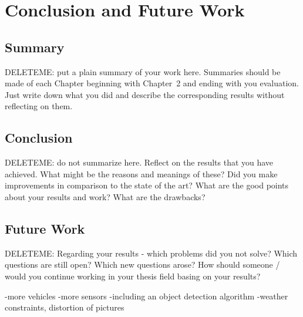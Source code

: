 \chapter{Conclusion and Future Work}
\label{conclusion}
\section{Summary}
DELETEME: put a plain summary of your work here. Summaries should be made of each Chapter beginning with Chapter~2 and ending with you evaluation. Just write down what you did and describe the corresponding results without reflecting on them.

\section{Conclusion}
DELETEME: do not summarize here. Reflect on the results that you have achieved. What might be the reasons and meanings of these? Did you make improvements in comparison to the state of the art? What are the good points about your results and work? What are the drawbacks? 

\section{Future Work}
DELETEME: Regarding your results - which problems did you not solve? Which questions are still open? Which new questions arose? How should someone / would you continue working in your thesis field basing on your results?

-more vehicles
-more sensors
-including an object detection algorithm
-weather constraints, distortion of pictures